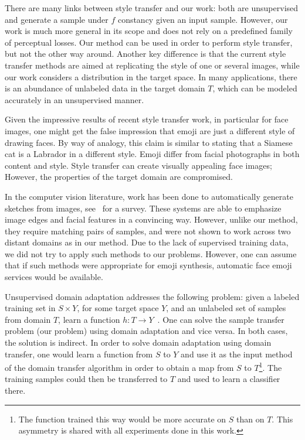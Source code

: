 \documentclass{article} %
\begin{document}
There are many links between style transfer and our work: both are unsupervised and generate a sample under $f$ constancy given an input sample. However, our work is much more general in its scope and does not rely on a predefined family of perceptual losses. Our method can be used in order to perform style transfer, but not the other way around.  Another key difference is that the current style transfer methods are aimed at replicating the style of one or several images, while our work considers a distribution in the target space. In many applications, there is an abundance of unlabeled data in the target domain $T$, which can be modeled accurately in an unsupervised manner.

Given the impressive results of recent style transfer work, in particular for face images, one might get the false impression that emoji are just a different style of drawing faces. By way of analogy, this claim is similar to stating that a Siamese cat is a Labrador in a different style. Emoji differ from facial photographs in both content and style. Style transfer can create visually appealing face images; However, the  properties of the target domain are compromised. 

In the computer vision literature, work has been done to automatically generate sketches from images, see~\citet{6243138} for a survey. These systems are able to emphasize image edges and facial features in a convincing way. However, unlike our method, they require matching pairs of samples, and were not shown to work across two distant domains as in our method. Due to the lack of supervised training data, we did not try to apply such methods to our problems. However, one can assume that if such methods were appropriate for emoji synthesis, automatic face emoji services would be available.

Unsupervised domain adaptation addresses the following problem: given a labeled training set in $S \times Y$, for some target space $Y$, and an unlabeled set of samples from domain $T$, learn a function $h:T \rightarrow Y$~\citep{ICML2012Chen_416,domaingan}. One can solve the sample transfer problem (our problem) using domain adaptation and vice versa. In both cases, the solution is indirect. In order to solve domain adaptation using domain transfer, one would learn a function from $S$ to $Y$ and use it as the input method of the domain transfer algorithm in order to obtain a map from $S$ to $T$\footnote{The function trained this way would be more accurate on $S$ than on $T$. This asymmetry is shared with all experiments done in this work.}. The training samples could then be transferred to $T$ and used to learn a classifier there. 
\end{document}
